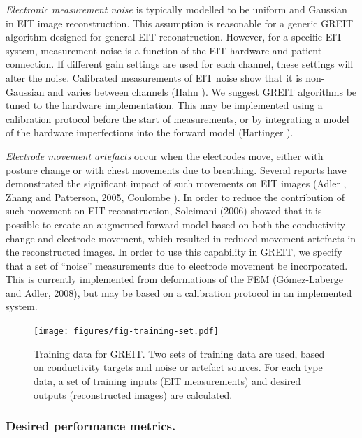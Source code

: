 \documentclass[12pt]{iopart}
\begin{document}
{\em Electronic measurement noise}
is typically modelled to be uniform and Gaussian in EIT
image reconstruction. This assumption is reasonable for
a generic GREIT algorithm designed for general EIT reconstruction.
However, for a specific EIT system, measurement noise
is a function of the EIT hardware and patient
connection. If different gain settings are used for each
channel, these settings will alter the noise. Calibrated
measurements of EIT noise show that it is non-Gaussian and
varies between channels (Hahn ).
 We suggest GREIT algorithms
be tuned to the hardware implementation. This may be 
implemented using a calibration protocol before the 
start of measurements, or by integrating a model of 
the hardware imperfections into the forward model
(Hartinger ).

{\em Electrode movement artefacts}
occur when the electrodes move, either with posture change
or with chest movements due to breathing. Several reports
have demonstrated the significant impact of such movements on
EIT images (Adler , Zhang and Patterson, 2005,
Coulombe ). In order to reduce the contribution
of such movement on EIT reconstruction, Soleimani \etal
(2006) showed that it is possible to create an
augmented forward model based on both the conductivity change
and electrode movement, which resulted in reduced movement 
artefacts in the reconstructed images. In order
to use this capability in GREIT, we specify that a
set of ``noise'' measurements due to electrode movement 
be incorporated. This is currently implemented from
deformations of the FEM (G\'omez-Laberge and Adler, 2008),
but may be based on a calibration protocol in an
implemented system.

\begin{figure}[bhtp]
\begin{center}
\texttt{[image: figures/fig-training-set.pdf]}
\caption{ \label{fig:desired_performance}
Training data for GREIT. Two sets of training data are used, based on
conductivity targets and noise or artefact sources. For each type
data, a set of training inputs (EIT measurements) and desired
outputs (reconstructed images) are calculated.
}
\end{center}
\end{figure}

 
\subsubsection{Desired performance metrics.}
\end{document}

